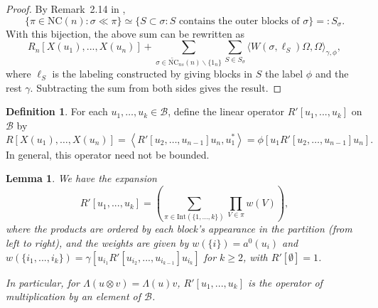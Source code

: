 \documentclass[12pt]{amsart}
\newtheorem{Lemma}[Thm]{Lemma}
\theoremstyle{definition}
\newtheorem{Defn}[Thm]{Definition}
\newcommand{\mc}[1]{\mathcal{#1}}
\newcommand{\ip}[2]{\left \langle{#1},{#2} \right \rangle}
\begin{document}
\begin{proof}
By Remark~2.14 in \cite{Belinschi-Nica-Eta},
\[
\{\pi\in\mathrm{NC}(n) : \sigma \ll \pi\} \simeq \{S\subset \sigma : S\text{ contains the outer blocks of } \sigma\} =: S_\sigma.
\]
With this bijection, the above sum can be rewritten as
\begin{equation*}
R_n[X(u_1),...,X(u_n)] + \sum_{\sigma\in\widetilde{\mathrm{NC}}_{ns}(n) \backslash \{1_n\}} \sum_{S\in S_\sigma} \langle W(\sigma,\ell_S)\Omega , \Omega \rangle_{\gamma,\phi},
\end{equation*}
where $\ell_S$ is the labeling constructed by giving blocks in $S$ the label $\phi$ and the rest $\gamma$. Subtracting the sum from both sides gives the result.
\end{proof}


\begin{Defn}
	\label{Defn:R-prime}
	For each $u_1, \ldots, u_k \in \mc{B}$, define the linear operator $R'[u_1,...,u_k]$ on $\mc{B}$ by
	\begin{equation}
\label{Eq:R'-definition2}
	R[X(u_1), \ldots, X(u_n)] = \ip{R'[u_2, \ldots, u_{n-1}] u_n}{u_1^\ast} = \phi[u_1 R'[u_2, \ldots, u_{n-1}] u_n] .
	\end{equation}
In general, this operator need not be bounded.
\end{Defn}


\begin{Lemma}
	\label{Lemma:R-prime}
We have the expansion
	\begin{equation}
\label{Eq:R'-definition}
	R'[u_1,...,u_k] = \left( \sum_{\pi \in \mathrm{Int}(\{1,...,k\})} \prod_{V\in\pi} w(V) \right),
	\end{equation}
	where the products are ordered by each block's appearance in the partition (from left to right), and the weights are given by $w(\{i\}) = a^0 (u_i)$ and $w(\{i_1,...,i_k\}) = \gamma[u_{i_1}R'[u_{i_2},...,u_{i_{k-1}}]u_{i_k}]$ for $k\geq 2$, with $R'[\emptyset] = 1$.

In particular, for $\Lambda(u \otimes v) = \Lambda(u) v$, $R'[u_1,...,u_k]$ is the operator of multiplication by an element of $\mc{B}$.
\end{Lemma}
\end{document}

